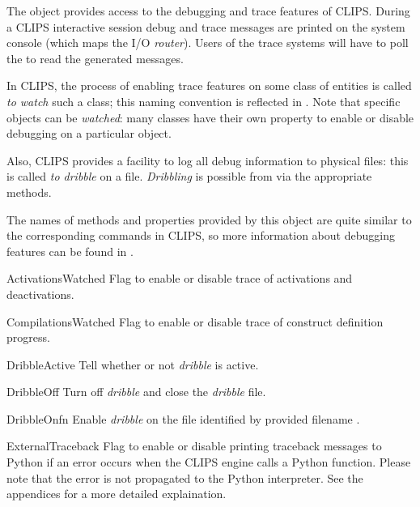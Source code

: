 The  object provides access to the debugging and trace
features of CLIPS. During a CLIPS interactive session debug and trace
messages are printed on the system console (which maps the 
I/O \emph{router}). Users of the trace systems will have to poll the
 to read the generated messages.

In CLIPS, the process of enabling trace features on some class of
entities is called \emph{to watch} such a class; this naming convention
is reflected in \pyclips{}. Note that specific objects can be
\emph{watched}: many classes have their own  property to
enable or disable debugging on a particular object.

Also, CLIPS provides a facility to log all debug information to physical
files: this is called \emph{to dribble} on a file. \emph{Dribbling} is
possible from  via the appropriate methods.

The names of methods and properties provided by this object are quite
similar to the corresponding commands in CLIPS, so more information
about debugging features can be found in \clipsbpg{}.

\begin{memberdesc}[property]{ActivationsWatched}
Flag to enable or disable trace of  activations and
deactivations.
\end{memberdesc}

\begin{memberdesc}[property]{CompilationsWatched}
Flag to enable or disable trace of construct definition progress.
\end{memberdesc}

\begin{methoddesc}{DribbleActive}{}
Tell whether or not \emph{dribble} is active.
\end{methoddesc}

\begin{methoddesc}{DribbleOff}{}
Turn off \emph{dribble} and close the \emph{dribble} file.
\end{methoddesc}

\begin{methoddesc}{DribbleOn}{fn}
Enable \emph{dribble} on the file identified by provided filename
.
\end{methoddesc}

\begin{memberdesc}[property]{ExternalTraceback}
Flag to enable or disable printing traceback messages to Python
 if an error occurs when the CLIPS engine calls a
Python function. Please note that the error is not propagated to the
Python interpreter. See the appendices for a more detailed explaination.
\end{memberdesc}

